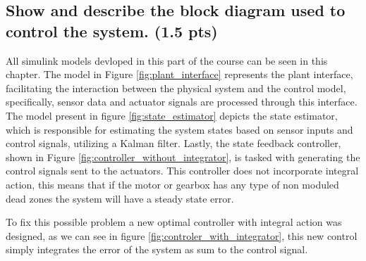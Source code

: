 \subsection{Show and describe the block diagram used to control the system. (1.5 pts)}
\vspace{10pt}


All simulink models devloped in this part of the course can be seen in this chapter. The model in Figure \ref{fig:plant_interface} represents the plant interface, facilitating the interaction between the physical system and the control model, specifically, sensor data and actuator signals are processed through this interface. The model present in figure \ref{fig:state_estimator} depicts the state estimator, which is responsible for estimating the system states based on sensor inputs and control signals, utilizing a Kalman filter. Lastly, the state feedback controller, shown in Figure \ref{fig:controller_without_integrator}, is tasked with generating the control signals sent to the actuators. This controller does not incorporate integral action, this means that if the motor or gearbox has any type of non moduled dead zones the system will have a steady state error.

To fix this possible problem a new optimal controller with integral action was designed, as we can see in figure \ref{fig:controler_with_integrator}, this new control simply integrates the error of the system as sum to the control signal.

